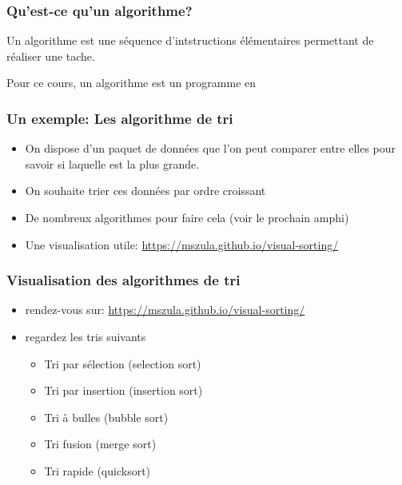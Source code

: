 \documentclass[aspectratio=169]{beamer}
\begin{document}
\begin{frame}
  \frametitle{Qu'est-ce qu'un algorithme?}

  \begin{definition}
    Un algorithme est une séquence d'intstructions \alert{élémentaires}
    permettant de réaliser une tache.
  \end{definition}

  \vspace{1cm}

  Pour ce cours, un algorithme est un programme en \Cpp


\end{frame}

\begin{frame}
  \frametitle{Un exemple: Les algorithme de tri}

  \begin{itemize}
  \item On dispose d'un paquet de données que l'on peut comparer entre elles
    pour savoir si laquelle est la plus grande.
  \item On souhaite trier ces données par ordre croissant
  \item De nombreux algorithmes pour faire cela (voir le prochain amphi)
  \item Une visualisation utile:
    \url{https://mszula.github.io/visual-sorting/}
  \end{itemize}


\end{frame}

\begin{frame}
  \frametitle{Visualisation des algorithmes de tri}
  \begin{itemize}
      \item rendez-vous sur:
        \url{https://mszula.github.io/visual-sorting/}

      \item regardez les tris suivants
        \begin{itemize}
        \item Tri par sélection (selection sort)
        \item Tri par insertion (insertion sort)
        \item Tri à bulles (bubble sort)
        \item Tri fusion (merge sort)
        \item Tri rapide (quicksort)
        \end{itemize}
  \end{itemize}
\end{frame}
\end{document}
